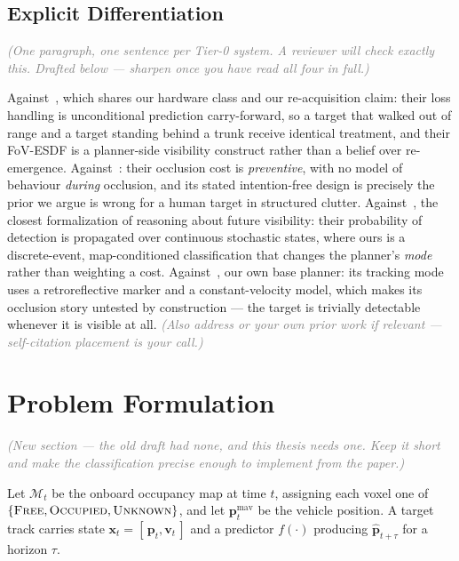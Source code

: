 \documentclass[conference]{IEEEtran}
\newcommand{\note}[1]{\textcolor{gray}{\textit{(#1)}}}
\begin{document}
\subsection{Explicit Differentiation}
\note{One paragraph, one sentence per Tier-0 system. A reviewer will check
exactly this. Drafted below --- sharpen once you have read all four in full.}

Against~\cite{lin2026evatracker}, which shares our hardware class and our
re-acquisition claim: their loss handling is unconditional prediction
carry-forward, so a target that walked out of range and a target standing behind
a trunk receive identical treatment, and their FoV-ESDF is a planner-side
visibility construct rather than a belief over re-emergence.
Against~\cite{ji2022elastic}: their occlusion cost is \emph{preventive}, with no
model of behaviour \emph{during} occlusion, and its stated intention-free design
is precisely the prior we argue is wrong for a human target in structured
clutter. Against~\cite{bpod2023}, the closest formalization of reasoning about
future visibility: their probability of detection is propagated over continuous
stochastic states, where ours is a discrete-event, map-conditioned classification
that changes the planner's \emph{mode} rather than weighting a cost.
Against~\cite{ren2025super}, our own base planner: its tracking mode uses a
retroreflective marker and a constant-velocity model, which makes its occlusion
story untested by construction --- the target is trivially detectable whenever it
is visible at all. \note{Also address \cite{bera2016glmp} or your own prior work
if relevant --- self-citation placement is your call.}

\section{Problem Formulation}
\label{sec:problem}

\note{New section --- the old draft had none, and this thesis needs one. Keep it
short and make the classification precise enough to implement from the paper.}

Let $\mathcal{M}_t$ be the onboard occupancy map at time $t$, assigning each
voxel one of $\{\textsc{Free}, \textsc{Occupied}, \textsc{Unknown}\}$, and let
$\mathbf{p}^{\text{mav}}_t$ be the vehicle position. A target track carries state
$\mathbf{x}_t = [\,\mathbf{p}_t, \mathbf{v}_t\,]$ and a predictor
$f(\cdot)$ producing $\hat{\mathbf{p}}_{t+\tau}$ for a horizon $\tau$.
\end{document}
